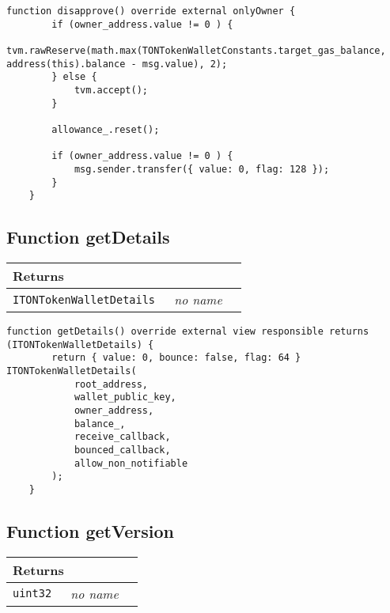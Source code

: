 \vspace{2cm}

\begin{lstlisting}[firstnumber=148]
    function disapprove() override external onlyOwner {
        if (owner_address.value != 0 ) {
            tvm.rawReserve(math.max(TONTokenWalletConstants.target_gas_balance, address(this).balance - msg.value), 2);
        } else {
            tvm.accept();
        }

        allowance_.reset();

        if (owner_address.value != 0 ) {
            msg.sender.transfer({ value: 0, flag: 128 });
        }
    }
\end{lstlisting}

\subsection{Function getDetails}


\ifsoltables
\noindent\begin{tabular}{|l|l|p{5cm}|}\hline
\multicolumn{3}{|l|}{\bf Returns}\\\hline
\tt ITONTokenWalletDetails & {\em no name} &\\\hline
\end{tabular}
\fi

\vspace{2cm}

\begin{lstlisting}[firstnumber=72]
    function getDetails() override external view responsible returns (ITONTokenWalletDetails) {
        return { value: 0, bounce: false, flag: 64 } ITONTokenWalletDetails(
            root_address,
            wallet_public_key,
            owner_address,
            balance_,
            receive_callback,
            bounced_callback,
            allow_non_notifiable
        );
    }
\end{lstlisting}

\subsection{Function getVersion}


\ifsoltables
\noindent\begin{tabular}{|l|l|p{5cm}|}\hline
\multicolumn{3}{|l|}{\bf Returns}\\\hline
\tt uint32 & {\em no name} &\\\hline
\end{tabular}
\fi

